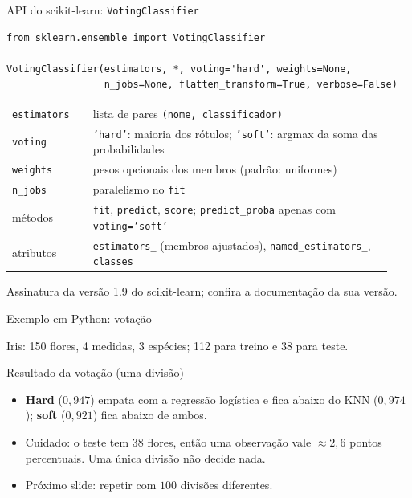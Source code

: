 \begin{frame}[fragile]{API do scikit-learn: \texttt{VotingClassifier}}
\begin{lstlisting}[style=py]
from sklearn.ensemble import VotingClassifier

VotingClassifier(estimators, *, voting='hard', weights=None,
                 n_jobs=None, flatten_transform=True, verbose=False)
\end{lstlisting}
\vspace{2pt}
\footnotesize
\begin{tabular}{@{}p{0.2\linewidth}p{0.74\linewidth}@{}}
\toprule
\texttt{estimators} & lista de pares \texttt{(nome, classificador)}\\
\texttt{voting} & \texttt{'hard'}: maioria dos rótulos; \texttt{'soft'}: argmax da soma das probabilidades\\
\texttt{weights} & pesos opcionais dos membros (padrão: uniformes)\\
\texttt{n\_jobs} & paralelismo no \texttt{fit}\\
\midrule
métodos & \texttt{fit}, \texttt{predict}, \texttt{score}; \texttt{predict\_proba} apenas com \texttt{voting='soft'}\\
atributos & \texttt{estimators\_} (membros ajustados), \texttt{named\_estimators\_}, \texttt{classes\_}\\
\bottomrule
\end{tabular}

\vspace{2pt}
{\scriptsize Assinatura da versão 1.9 do scikit-learn; confira a documentação da sua versão.}
\end{frame}

\begin{frame}[fragile]{Exemplo em Python: votação}

\vspace{2pt}
{\scriptsize Iris: 150 flores, 4 medidas, 3 espécies; 112 para treino e 38 para teste.}
\end{frame}

\begin{frame}[fragile]{Resultado da votação (uma divisão)}

\vspace{4pt}
\begin{itemize}
  \item \textbf{Hard} ($0{,}947$) empata com a regressão logística e fica abaixo do KNN ($0{,}974$); \textbf{soft} ($0{,}921$) fica abaixo de ambos.
  \item Cuidado: o teste tem $38$ flores, então \alert{uma} observação vale $\approx2{,}6$ pontos percentuais. Uma única divisão não decide nada.
  \item Próximo slide: repetir com $100$ divisões diferentes.
\end{itemize}
\end{frame}

